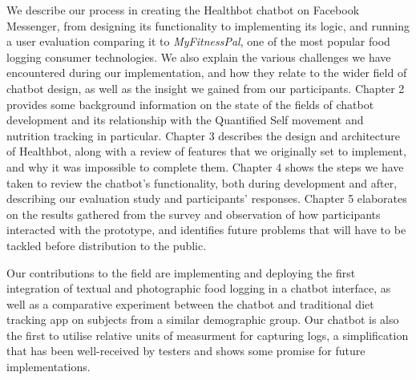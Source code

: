 We describe our process in creating the Healthbot chatbot on Facebook Messenger, from designing its functionality to implementing its logic, and running a user evaluation comparing it to \textit{MyFitnessPal}, one of the most popular food logging consumer technologies. We also explain the various challenges we have encountered during our implementation, and how they relate to the wider field of chatbot design, as well as the insight we gained from our participants. Chapter 2 provides some background information on the state of the fields of chatbot development and its relationship with the Quantified Self movement and nutrition tracking in particular. Chapter 3 describes the design and architecture of Healthbot, along with a review of features that we originally set to implement, and why it was impossible to complete them. Chapter 4 shows the steps we have taken to review the chatbot's functionality, both during development and after, describing our evaluation study and participants' responses. Chapter 5 elaborates on the results gathered from the survey and observation of how participants interacted with the prototype, and identifies future problems that will have to be tackled before distribution to the public.

Our contributions to the field are implementing and deploying the first integration of textual and photographic food logging in a chatbot interface, as well as a comparative experiment between the chatbot and traditional diet tracking app on subjects from a similar demographic group. Our chatbot is also the first to utilise relative units of measurment for capturing logs, a simplification that has been well-received by testers and shows some promise for future implementations.
